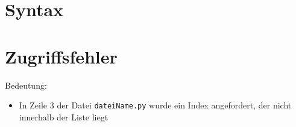 \section{Syntax}
\begin{frame}
	\slidehead
\end{frame}

\section{Zugriffsfehler}
\begin{frame}
	\slidehead
	Bedeutung:
	\begin{itemize}
		\item In Zeile 3 der Datei \texttt{dateiName.py} wurde ein Index angefordert, der nicht innerhalb der Liste liegt
	\end{itemize}

\end{frame}



